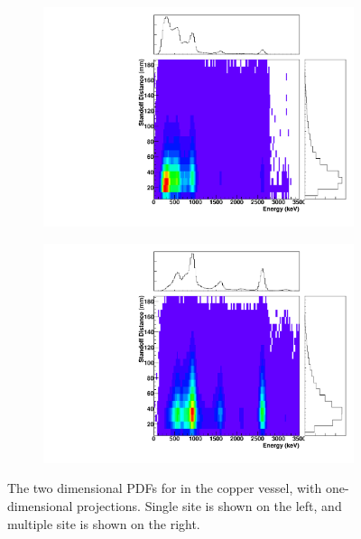 \documentclass[herrin-thesis.tex]{subfiles}
\begin{document}
\begin{figure}[hp]
\centering
	\begin{subfigure}[b]{0.48\textwidth}
	\centering
	\includegraphics[width=\textwidth]{./plots/PDFs/analysis_pdf_AllVessel_Th232_ss.pdf}
\end{subfigure}\hfill%
\begin{subfigure}[b]{0.48\textwidth}
	\centering
	\includegraphics[width=1\textwidth]{./plots/PDFs/analysis_pdf_AllVessel_Th232_ms.pdf}
	\end{subfigure}
\caption[PDF for  in the TPC vessel]{The two dimensional PDFs for  in the copper vessel, with one-dimensional projections. Single site is shown on the left, and multiple site is shown on the right.}
\label{fig:analysis_pdf_AllVessel_Th232}
\end{figure}
\end{document}
